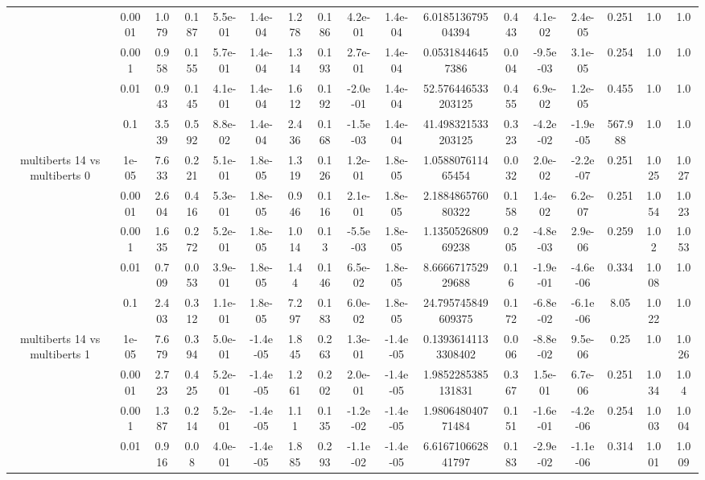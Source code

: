 \begin{tabular}{|c|c|c|c|c|c|c|c|c|c|c|c|c|c|c|c|c|}
 & 0.0001 & 1.079 & 0.187 & 5.5e-01 & 1.4e-04 & 1.278 & 0.186 & 4.2e-01 & 1.4e-04 & 6.018513679504394 & 0.443 & 4.1e-02 & 2.4e-05 & 0.251 & 1.0 & 1.0 \\
 & 0.001 & 0.958 & 0.155 & 5.7e-01 & 1.4e-04 & 1.314 & 0.193 & 2.7e-01 & 1.4e-04 & 0.05318446457386 & 0.004 & -9.5e-03 & 3.1e-05 & 0.254 & 1.0 & 1.0 \\
 & 0.01 & 0.943 & 0.145 & 4.1e-01 & 1.4e-04 & 1.612 & 0.192 & -2.0e-01 & 1.4e-04 & 52.576446533203125 & 0.455 & 6.9e-02 & 1.2e-05 & 0.455 & 1.0 & 1.0 \\
 & 0.1 & 3.539 & 0.592 & 8.8e-02 & 1.4e-04 & 2.436 & 0.168 & -1.5e-03 & 1.4e-04 & 41.498321533203125 & 0.323 & -4.2e-02 & -1.9e-05 & 567.988 & 1.0 & 1.0 \\
\hline
\multirow{5}{*}{multiberts 14 vs multiberts 0} & 1e-05 & 7.633 & 0.221 & 5.1e-01 & 1.8e-05 & 1.319 & 0.126 & 1.2e-01 & 1.8e-05 & 1.058807611465454 & 0.032 & 2.0e-02 & -2.2e-07 & 0.251 & 1.025 & 1.027 \\
 & 0.0001 & 2.604 & 0.416 & 5.3e-01 & 1.8e-05 & 0.946 & 0.116 & 2.1e-01 & 1.8e-05 & 2.188486576080322 & 0.158 & 1.4e-02 & 6.2e-07 & 0.251 & 1.054 & 1.023 \\
 & 0.001 & 1.635 & 0.272 & 5.2e-01 & 1.8e-05 & 1.014 & 0.13 & -5.5e-03 & 1.8e-05 & 1.135052680969238 & 0.205 & -4.8e-03 & 2.9e-06 & 0.259 & 1.02 & 1.053 \\
 & 0.01 & 0.709 & 0.053 & 3.9e-01 & 1.8e-05 & 1.44 & 0.146 & 6.5e-02 & 1.8e-05 & 8.666671752929688 & 0.16 & -1.9e-01 & -4.6e-06 & 0.334 & 1.008 & 1.0 \\
 & 0.1 & 2.403 & 0.312 & 1.1e-01 & 1.8e-05 & 7.297 & 0.183 & 6.0e-02 & 1.8e-05 & 24.795745849609375 & 0.172 & -6.8e-02 & -6.1e-06 & 8.05 & 1.022 & 1.0 \\
\hline
\multirow{5}{*}{multiberts 14 vs multiberts 1} & 1e-05 & 7.679 & 0.394 & 5.0e-01 & -1.4e-05 & 1.845 & 0.263 & 1.3e-01 & -1.4e-05 & 0.13936141133308402 & 0.006 & -8.8e-02 & 9.5e-06 & 0.25 & 1.0 & 1.026 \\
 & 0.0001 & 2.723 & 0.425 & 5.2e-01 & -1.4e-05 & 1.261 & 0.202 & 2.0e-01 & -1.4e-05 & 1.9852285385131831 & 0.367 & 1.5e-01 & 6.7e-06 & 0.251 & 1.034 & 1.04 \\
 & 0.001 & 1.387 & 0.214 & 5.2e-01 & -1.4e-05 & 1.11 & 0.135 & -1.2e-02 & -1.4e-05 & 1.980648040771484 & 0.151 & -1.6e-01 & -4.2e-06 & 0.254 & 1.003 & 1.004 \\
 & 0.01 & 0.916 & 0.08 & 4.0e-01 & -1.4e-05 & 1.885 & 0.293 & -1.1e-02 & -1.4e-05 & 6.616710662841797 & 0.183 & -2.9e-02 & -1.1e-06 & 0.314 & 1.001 & 1.009 \\

\end{tabular}
